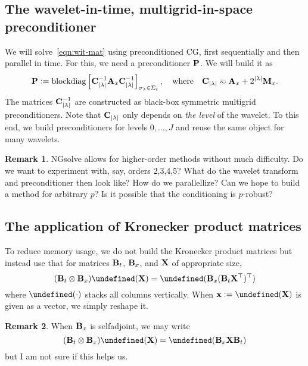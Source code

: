 \documentclass[11pt,a4paper]{amsart}
\theoremstyle{definition}
\newtheorem*{remark}{Remark}
\DeclareMathOperator{\blockdiag}{blockdiag}
\newcommand{\kron}{\otimes}
\let\Vec\undefined
\DeclareMathOperator*{\Vec}{Vec}
\begin{document}
\subsection*{The wavelet-in-time, multigrid-in-space preconditioner}
We will solve~\eqref{eqn:wit-mat} using preconditioned CG, first sequentially and then parallel in time.
For this, we need a preconditioner ${\bf P}$. We will build it as
\[
  {\bf P} := \blockdiag\left[ {\bf C}_{|\lambda|}^{-1} {\bf A}_x {\bf C}_{|\lambda|}^{-1} \right]_{\sigma_\lambda \in \Sigma_t}, \quad \text{where} \quad {\bf C}_{|\lambda|} \eqsim {\bf A}_x + 2^{|\lambda|} {\bf M}_x.
\]
The matrices ${\bf C}_{|\lambda|}^{-1}$ are constructed as black-box symmetric multigrid preconditioners. Note that ${\bf C}_{|\lambda|}$ only depends on \emph{the level} of the wavelet. To this end, we build preconditioners for levels $0, \ldots, J$ and reuse the same object for many wavelets.

\begin{remark}
  NGsolve allows for higher-order methods without much difficulty. Do we want to experiment with, say, orders 2,3,4,5? What do the wavelet transform and preconditioner then look like? How do we parallellize? Can we hope to build a method for arbitrary $p$? Is it possible that the conditioning is $p$-robust?
\end{remark}

\subsection*{The application of Kronecker product matrices}
To reduce memory usage, we do not build the Kronecker product matrices but instead use that for matrices ${\bf B}_t$, ${\bf B}_x$, and ${\bf X}$ of
appropriate size,
\[
  ({\bf B}_t \kron {\bf B}_x) \Vec({\bf X}) = \Vec({\bf B}_x ({\bf B}_t {\bf X}^\top)^\top)
\]
where $\Vec(\cdot)$ stacks all columns vertically. When ${\bf x} := \Vec({\bf X})$ is given as a vector, we simply reshape it.

\begin{remark}
  When ${\bf B}_x$ is selfadjoint, we may write
\[
  ({\bf B}_t \kron {\bf B}_x) \Vec({\bf X}) = \Vec({\bf B}_x {\bf X} {\bf B}_t)
\]
but I am not sure if this helps us.
\end{remark}
\end{document}
